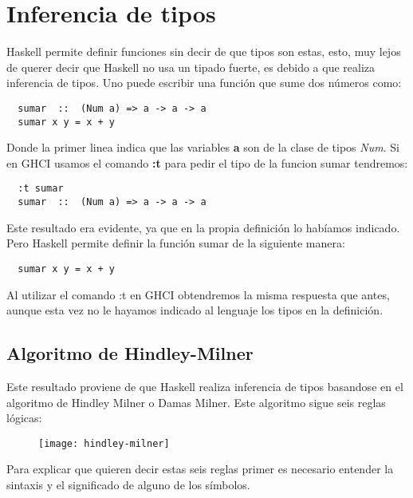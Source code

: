\section{Inferencia de tipos} %
\label{sec:inferencia_de_tipos}


Haskell permite definir funciones sin decir de que tipos son estas, esto, muy lejos de querer decir que Haskell no usa un tipado fuerte, es debido a que realiza inferencia de tipos.
Uno puede escribir una función que sume dos números como:

\begin{lstlisting}
  sumar  ::  (Num a) => a -> a -> a
  sumar x y = x + y
\end{lstlisting}

Donde la primer linea indica que las variables \textbf{a} son de la clase de tipos \textit{Num}.
Si en GHCI usamos el comando \textbf{:t} para pedir el tipo de la funcion sumar tendremos:

\begin{lstlisting}
  :t sumar
  sumar  ::  (Num a) => a -> a -> a
\end{lstlisting}

Este resultado era evidente, ya que en la propia definición lo habíamos indicado. Pero Haskell permite definir la función sumar de la siguiente manera:

\begin{lstlisting}
  sumar x y = x + y
\end{lstlisting}

Al utilizar el comando :t en GHCI obtendremos la misma respuesta que antes, aunque esta vez no le  hayamos indicado al lenguaje los tipos en la definición.

\subsection{Algoritmo de Hindley-Milner} %

Este resultado proviene de que Haskell realiza inferencia de tipos basandose en el algoritmo de Hindley Milner o Damas Milner.
Este algoritmo sigue seis reglas lógicas:
\begin{figure}[H]
\texttt{[image: hindley-milner]}
\end{figure}

Para explicar que quieren decir estas seis reglas primer es necesario entender la sintaxis y el significado de alguno de los símbolos.


